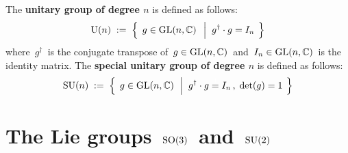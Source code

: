 \vskip 0.5cm
\begin{definition}
\mbox{}
\vskip 0.1cm
\noindent
The \textbf{unitary group of degree $n$} is defined as follows:
\begin{equation*}
\textnormal{U}(n)
\; := \;
	\left\{\;\,
		g \overset{{\color{white}.}}{\in} \textnormal{GL}(n,\C)
		\;\;\left\vert\;\;
			g^{\dagger} \cdot g \overset{{\color{white}1}}{=} I_{n}
			\right.
		\;\right\}
\end{equation*}
where \,$g^{\dagger}$\, is the conjugate transpose of
\,$g \in \textnormal{GL}(n,\mathbb{C})$\,
and
\,$I_{n} \in \textnormal{GL}(n,\mathbb{C})$\,
is the identity matrix.
\vskip 0.1cm
\noindent
The \textbf{special unitary group of degree $n$} is defined as follows:
\begin{equation*}
\textnormal{SU}(n)
\; := \;
	\left\{\;\,
		g \overset{{\color{white}.}}{\in} \textnormal{GL}(n,\C)
		\;\,\left\vert\;\;
			g^{\dagger} \cdot g \overset{{\color{white}1}}{=} I_{n}\,,
			\;
			\textnormal{det}(g) = 1
			\right.
		\;\right\}
\end{equation*}
\end{definition}


\vskip 1.0cm
\section{The Lie groups \,$\textnormal{SO}(3)$\, and \,$\textnormal{SU}(2)$}


